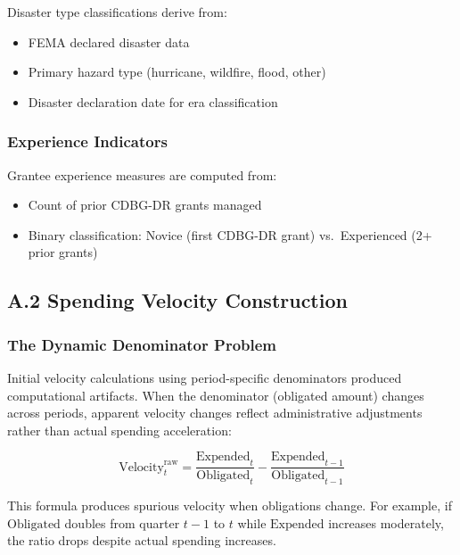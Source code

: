 \documentclass[
  12pt,
  letterpaper,
]{article}
\providecommand{\tightlist}{%
  \setlength{\itemsep}{0pt}\setlength{\parskip}{0pt}}
\begin{document}
Disaster type classifications derive from:

\begin{itemize}
\tightlist
\item
  FEMA declared disaster data
\item
  Primary hazard type (hurricane, wildfire, flood, other)
\item
  Disaster declaration date for era classification
\end{itemize}

\subsubsection{Experience Indicators}\label{experience-indicators}

Grantee experience measures are computed from:

\begin{itemize}
\tightlist
\item
  Count of prior CDBG-DR grants managed
\item
  Binary classification: Novice (first CDBG-DR grant) vs.~Experienced
  (2+ prior grants)
\end{itemize}

\subsection{A.2 Spending Velocity
Construction}\label{a.2-spending-velocity-construction}

\subsubsection{The Dynamic Denominator
Problem}\label{the-dynamic-denominator-problem}

Initial velocity calculations using period-specific denominators
produced computational artifacts. When the denominator (obligated
amount) changes across periods, apparent velocity changes reflect
administrative adjustments rather than actual spending acceleration:

\[
\text{Velocity}_t^{\text{raw}} = \frac{\text{Expended}_t}{\text{Obligated}_t} - \frac{\text{Expended}_{t-1}}{\text{Obligated}_{t-1}}
\]

This formula produces spurious velocity when obligations change. For
example, if \(\text{Obligated}\) doubles from quarter \(t-1\) to \(t\)
while \(\text{Expended}\) increases moderately, the ratio drops despite
actual spending increases.
\end{document}

